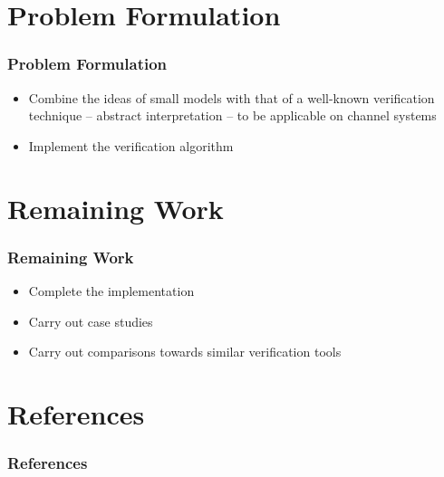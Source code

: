 \documentclass{beamer}
\begin{document}
\section{Problem Formulation}
\begin{frame}
  \frametitle{Problem Formulation}
  \begin{itemize}
  \item
    Combine the ideas of small models with that of a well-known verification technique -- abstract interpretation – to be applicable on channel systems
  \item
    Implement the verification algorithm
  \end{itemize}
\end{frame}
\section{Remaining Work}
\begin{frame}
  \frametitle{Remaining Work}
  \begin{itemize}
  \item
    Complete the implementation
  \item
    Carry out case studies
  \item
    Carry out comparisons towards similar verification tools
  \end{itemize}
\end{frame}

\section{References}
\begin{frame}
  \frametitle{References}
  \printbibliography
\end{frame}

\begin{frame}[plain]
  \begin{centering}
    \par
  \end{centering}
\end{frame}
\end{document}
